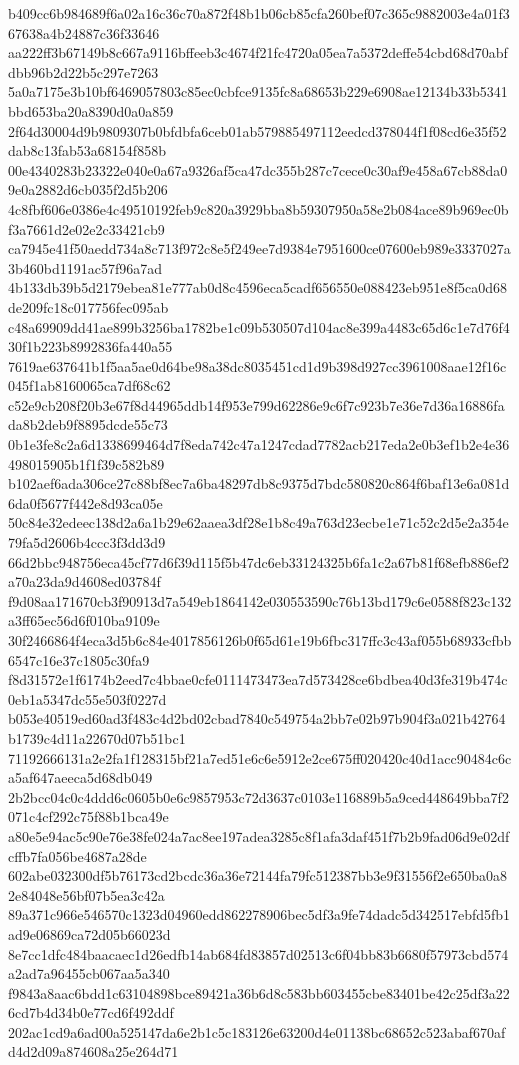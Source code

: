 {b409cc6b984689f6a02a16c36c70a872f48b1b06cb85cfa260bef07c365c9882003e4a01f367638a4b24887c36f33646
aa222ff3b67149b8c667a9116bffeeb3c4674f21fc4720a05ea7a5372deffe54cbd68d70abfdbb96b2d22b5c297e7263
5a0a7175e3b10bf6469057803c85ec0cbfce9135fc8a68653b229e6908ae12134b33b5341bbd653ba20a8390d0a0a859
2f64d30004d9b9809307b0bfdbfa6ceb01ab579885497112eedcd378044f1f08cd6e35f52dab8c13fab53a68154f858b
00e4340283b23322e040e0a67a9326af5ca47dc355b287c7cece0c30af9e458a67cb88da09e0a2882d6cb035f2d5b206
4c8fbf606e0386e4c49510192feb9c820a3929bba8b59307950a58e2b084ace89b969ec0bf3a7661d2e02e2c33421cb9
ca7945e41f50aedd734a8c713f972c8e5f249ee7d9384e7951600ce07600eb989e3337027a3b460bd1191ac57f96a7ad
4b133db39b5d2179ebea81e777ab0d8c4596eca5cadf656550e088423eb951e8f5ca0d68de209fc18c017756fec095ab
c48a69909dd41ae899b3256ba1782be1c09b530507d104ac8e399a4483c65d6c1e7d76f430f1b223b8992836fa440a55
7619ae637641b1f5aa5ae0d64be98a38dc8035451cd1d9b398d927cc3961008aae12f16c045f1ab8160065ca7df68c62
c52e9cb208f20b3e67f8d44965ddb14f953e799d62286e9c6f7c923b7e36e7d36a16886fada8b2deb9f8895dcde55c73
0b1e3fe8c2a6d1338699464d7f8eda742c47a1247cdad7782acb217eda2e0b3ef1b2e4e36498015905b1f1f39c582b89
b102aef6ada306ce27c88bf8ec7a6ba48297db8c9375d7bdc580820c864f6baf13e6a081d6da0f5677f442e8d93ca05e
50c84e32edeec138d2a6a1b29e62aaea3df28e1b8c49a763d23ecbe1e71c52c2d5e2a354e79fa5d2606b4ccc3f3dd3d9
66d2bbc948756eca45cf77d6f39d115f5b47dc6eb33124325b6fa1c2a67b81f68efb886ef2a70a23da9d4608ed03784f
f9d08aa171670cb3f90913d7a549eb1864142e030553590c76b13bd179c6e0588f823c132a3ff65ec56d6f010ba9109e
30f2466864f4eca3d5b6c84e4017856126b0f65d61e19b6fbc317ffc3c43af055b68933cfbb6547c16e37c1805c30fa9
f8d31572e1f6174b2eed7c4bbae0cfe0111473473ea7d573428ce6bdbea40d3fe319b474c0eb1a5347dc55e503f0227d
b053e40519ed60ad3f483c4d2bd02cbad7840c549754a2bb7e02b97b904f3a021b42764b1739c4d11a22670d07b51bc1
71192666131a2e2fa1f128315bf21a7ed51e6c6e5912e2ce675ff020420c40d1acc90484c6ca5af647aeeca5d68db049
2b2bcc04c0c4ddd6c0605b0e6c9857953c72d3637c0103e116889b5a9ced448649bba7f2071c4cf292c75f88b1bca49e
a80e5e94ac5c90e76e38fe024a7ac8ee197adea3285c8f1afa3daf451f7b2b9fad06d9e02dfcffb7fa056be4687a28de
602abe032300df5b76173cd2bcdc36a36e72144fa79fc512387bb3e9f31556f2e650ba0a82e84048e56bf07b5ea3c42a
89a371c966e546570c1323d04960edd862278906bec5df3a9fe74dadc5d342517ebfd5fb1ad9e06869ca72d05b66023d
8e7cc1dfc484baacaec1d26edfb14ab684fd83857d02513c6f04bb83b6680f57973cbd574a2ad7a96455cb067aa5a340
f9843a8aac6bdd1c63104898bce89421a36b6d8c583bb603455cbe83401be42c25df3a226cd7b4d34b0e77cd6f492ddf
202ac1cd9a6ad00a525147da6e2b1c5c183126e63200d4e01138bc68652c523abaf670afd4d2d09a874608a25e264d71
}
